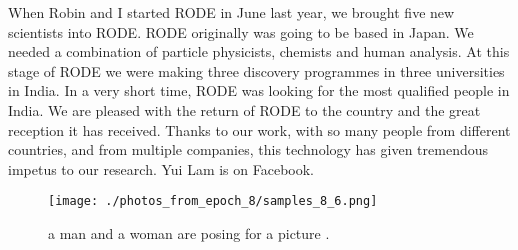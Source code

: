 \documentclass{article}%
\begin{document}
When Robin and I started RODE in June last year, we brought five new scientists into RODE.\newline%
RODE originally was going to be based in Japan. We needed a combination of particle physicists, chemists and human analysis. At this stage of RODE we were making three discovery programmes in three universities in India. In a very short time, RODE was looking for the most qualified people in India.\newline%
We are pleased with the return of RODE to the country and the great reception it has received. Thanks to our work, with so many people from different countries, and from multiple companies, this technology has given tremendous impetus to our research.\newline%
Yui Lam is on Facebook.\newline%

%


\begin{figure}[h!]%
\centering%
\texttt{[image: ./photos\_from\_epoch\_8/samples\_8\_6.png]}%
\caption{a man and a woman are posing for a picture .}%
\end{figure}

%
\end{document}
